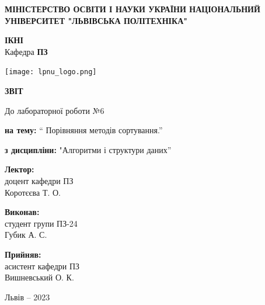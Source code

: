 \documentclass[12pt]{extarticle}
\begin{document}
\begin{titlepage}
    \begin{center}
        \textbf{\normalsize{\MakeUppercase{
            Міністерство Освіти і науки України
            Національний університет "Львівська політехніка"
        }}}

        \begin{flushright}
        \textbf{ІКНІ}\\
        Кафедра \textbf{ПЗ}
        \end{flushright}
        \vspace{15mm}

        \texttt{[image: lpnu\_logo.png]}

        \vspace*{\fill}

        \textbf{\normalsize{\MakeUppercase{Звіт}}}
            
        До лабораторної роботи №6

        \textbf{на тему:} “ Порівняння методів сортування.”

        \textbf{з дисципліни:} "Алгоритми і структури даних”
            
        \vspace*{\fill}

        \begin{flushright}

            \textbf{Лектор:}\\
            доцент кафедри ПЗ\\
            Коротєєва Т. О.\\
            \vspace{12pt}

            \textbf{Виконав:}\\
            студент групи ПЗ-24\\
            Губик А. С.\\
            \vspace{12pt}

            \textbf{Прийняв:}\\
            асистент кафедри ПЗ\\
            Вишневський О. К.\\
        \vspace{12pt}
        \end{flushright}

        Львів -- 2023
            
            
    \end{center}
\end{titlepage}
\end{document}
